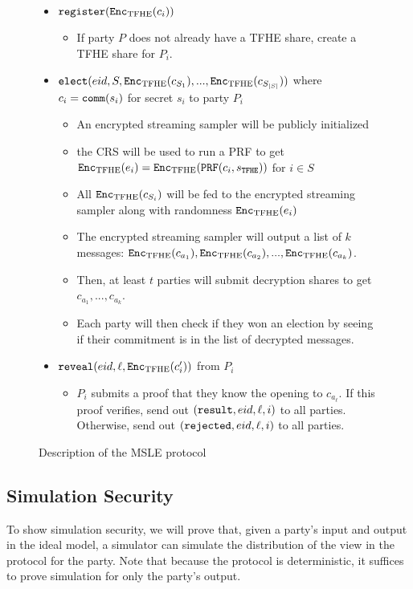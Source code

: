 \begin{figure}
{\begin{minipage}{1\textwidth}
\begin{itemize}
				\item $\texttt{register}(\texttt{Enc}_{\mathrm{TFHE}}(c_i))$
				      \begin{itemize}
					      \item If party $P$ does not already have a TFHE share, create a TFHE share for $P_i$.
				      \end{itemize}
				\item $\texttt{elect}({eid}, S, \texttt{Enc}_{\mathrm{TFHE}}(c_{S_1}), ..., \texttt{Enc}_{\mathrm{TFHE}}(c_{S_{|S|}}))$ where $c_i = \texttt{comm}(s_i)$ for secret $s_i$ to party $P_i$
				      \begin{itemize}
					      \item An encrypted streaming sampler will be publicly initialized
					      \item the CRS will be used to run a PRF to get $\texttt{Enc}_{\mathrm{TFHE}}(e_i) = \texttt{Enc}_{\mathrm{TFHE}}(\texttt{PRF}(c_i, s_\texttt{TFHE}))$ for $i \in S$
					      \item All $\texttt{Enc}_{\mathrm{TFHE}}(c_{S_i})$ will be fed to the encrypted streaming sampler along with randomness $\texttt{Enc}_{\mathrm{TFHE}}(e_i)$
					      \item The encrypted streaming sampler will output a list of $k$ messages: $\texttt{Enc}_{\mathrm{TFHE}}(c_{a_1}), \texttt{Enc}_{\mathrm{TFHE}}(c_{a_2}), ..., \texttt{Enc}_{\mathrm{TFHE}}(c_{a_k})$.
					      \item Then, at least $t$ parties will submit decryption shares to get $c_{a_1}, ..., c_{a_k}$.
					      \item Each party will then check if they won an election by seeing if their commitment is in the list of decrypted messages.
				      \end{itemize}
				\item $\texttt{reveal}({eid}, \ell, \texttt{Enc}_{\mathrm{TFHE}}(c'_i))$ from $P_i$
				      \begin{itemize}
					      \item $P_i$ submits a proof that they know the opening to $c_{a_\ell}$.
								If this proof verifies, send out $(\texttt{result}, {eid}, \ell, i)$ to all parties.
					      Otherwise, send out $(\texttt{rejected}, {eid}, \ell, i)$ to all parties.
				      \end{itemize}
			\end{itemize}
		\end{minipage}
	}
	\caption{Description of the MSLE protocol}
	\label{fig:protocolMSLE}
\end{figure}

\subsection{Simulation Security}
To show simulation security, we will prove that, given a party's input and output in the ideal model,
a simulator can simulate the distribution of the view in the protocol for the party. Note that because the
protocol is deterministic, it suffices to prove simulation for only the party's output.

